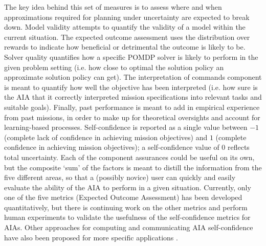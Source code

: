 The key idea behind this set of measures is to assess where and when approximations required for planning under uncertainty are expected to break down. Model validity attempts to quantify the validity of a model within the current situation. The expected outcome assessment uses the distribution over rewards to indicate how beneficial or detrimental the outcome is likely to be. Solver quality quantifies how a specific POMDP solver is likely to perform in the given problem setting (i.e. how close to optimal the solution policy an approximate solution policy can get). 
The interpretation of commands component is meant to quantify how well the objective has been interpreted (i.e. how sure is the AIA that it correctly interpreted mission specifications into relevant tasks and suitable goals). 
Finally, past performance is meant to add in empirical experience from past missions, in order to make up for theoretical oversights and account for learning-based processes. 
Self-confidence is reported as a single value between $-1$ (complete lack of confidence in achieving mission objectives) and $1$ (complete confidence in achieving mission objectives); a self-confidence value of $0$ reflects total uncertainty. 
Each of the component assurances could be useful on its own, but the composite `sum' of the factors is meant to distill the information from the five different areas, so that a (possibly novice) user can quickly and easily evaluate the ability of the AIA to perform in a given situation. 
Currently, only one of the five metrics (Expected Outcome Assessment) has been developed quantitatively, but there is continuing work on the other metrics and perform human experiments to validate the usefulness of the self-confidence metrics for AIAs. Other approaches for computing and communicating AIA self-confidence have also been proposed for more specific applications \cite{Hutchins2015-if, Kaipa2015-hy, Zagorecki2015-qy, Kuter2015-qh}. 

